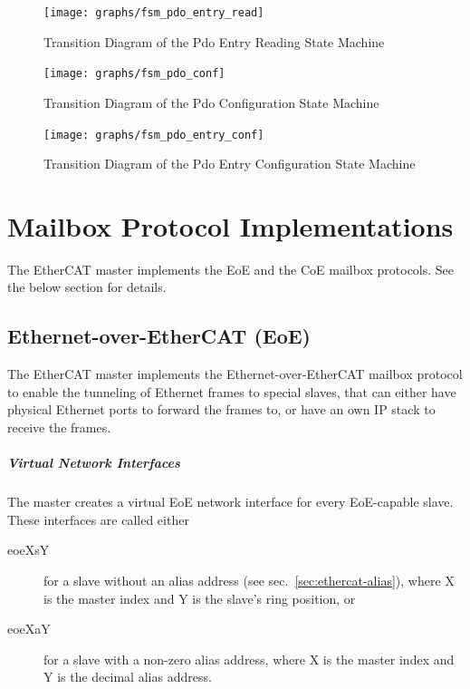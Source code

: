 \documentclass[a4paper,12pt,BCOR6mm,bibtotoc,idxtotoc]{scrbook}
\begin{document}
\begin{figure}[htbp]
  \centering
  \texttt{[image: graphs/fsm\_pdo\_entry\_read]}
  \caption{Transition Diagram of the Pdo Entry Reading State Machine}
  \label{fig:fsm-pdo-entry-read}
\end{figure}

\begin{figure}[htbp]
  \centering
  \texttt{[image: graphs/fsm\_pdo\_conf]}
  \caption{Transition Diagram of the Pdo Configuration State Machine}
  \label{fig:fsm-pdo-conf}
\end{figure}

\begin{figure}[htbp]
  \centering
  \texttt{[image: graphs/fsm\_pdo\_entry\_conf]}
  \caption{Transition Diagram of the Pdo Entry Configuration State Machine}
  \label{fig:fsm-pdo-entry-conf}
\end{figure}


\chapter{Mailbox Protocol Implementations}

The EtherCAT master implements the EoE and the CoE mailbox
protocols. See the below section for details.


\section{Ethernet-over-EtherCAT (EoE)}
\label{sec:eoe}

The EtherCAT master implements the Ethernet-over-EtherCAT mailbox protocol to
enable the tunneling of Ethernet frames to special slaves, that can either
have physical Ethernet ports to forward the frames to, or have an own IP stack
to receive the frames.

\paragraph{Virtual Network Interfaces}

The master creates a virtual EoE network interface for every EoE-capable
slave. These interfaces are called either

\begin{description}

\item[eoeXsY] for a slave without an alias address (see
sec.~\ref{sec:ethercat-alias}), where X is the master index and Y is the
slave's ring position, or

\item[eoeXaY] for a slave with a non-zero alias address, where X is the master
index and Y is the decimal alias address.

\end{description}
\end{document}
